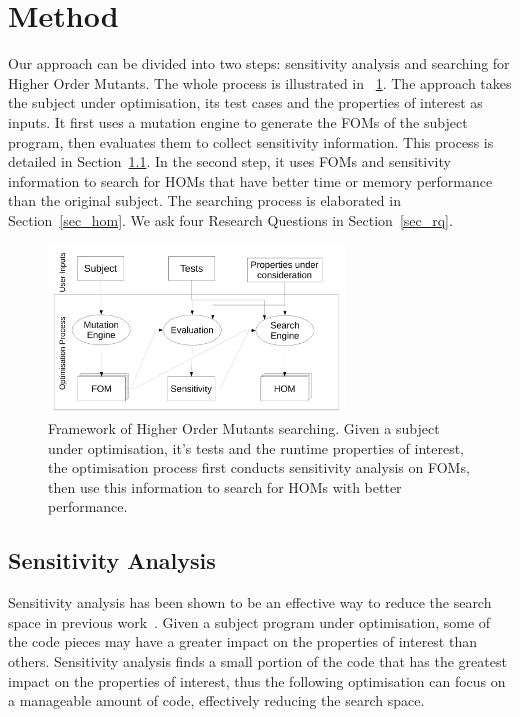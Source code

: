 \documentclass[oribibl]{llncs}
\begin{document}
\section{Method}
\label{sec_method}

Our approach can be divided into two steps: sensitivity analysis and searching for Higher Order Mutants.
The whole process is illustrated in \figurename~\ref{fig_framework}.
The approach takes the subject under optimisation, its test cases and the properties of interest as inputs.
It first uses a mutation engine to generate the FOMs of the subject program, then evaluates them to collect sensitivity information.
This process is detailed in Section~\ref{sec_sensitivity}.
In the second step, it uses FOMs and sensitivity information to search for HOMs that have better time or memory performance than the original subject.
The searching process is elaborated in Section~\ref{sec_hom}.
We ask four Research Questions in Section~\ref{sec_rq}.

\begin{figure}[h]
\centering
\includegraphics[width=0.7\textwidth]{framework}
\caption{Framework of Higher Order Mutants searching. Given a subject under optimisation, it's tests and the runtime properties of interest, the optimisation process first conducts sensitivity analysis on FOMs, then use this information to search for HOMs with better performance.}\label{fig_framework}
\end{figure}

\subsection{Sensitivity Analysis}
\label{sec_sensitivity}

Sensitivity analysis has been shown to be an effective way to reduce the search space in previous work~\cite{6733370,Bruce:2015:REC:2739480.2754752,6035728}.
Given a subject program under optimisation, some of the code pieces may have a greater impact on the properties of interest than others.
Sensitivity analysis finds a small portion of the code that has the greatest impact on the properties of interest, thus the following optimisation can focus on a manageable amount of code, effectively reducing the search space.
\end{document}
